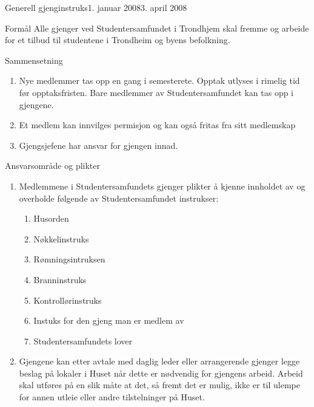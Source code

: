 

\begin{instruks}{Generell gjenginstruks}{1. januar 2008}{3. april 2008}
    
    \begin{instruksledd}{Formål}
        Alle gjenger ved Studentersamfundet i Trondhjem skal fremme og arbeide for et
        tilbud til studentene i Trondheim og byens befolkning.
    \end{instruksledd}


    \begin{instruksledd}{Sammensetning}
        \begin{enumerate}
            \item Nye medlemmer tas opp en gang i semesterete. Opptak utlyses i rimelig
                tid før opptaksfristen. Bare medlemmer av Studentersamfundet kan tas opp i
                gjengene.
            \item Et medlem kan innvilges permisjon og kan også fritas fra sitt medlemskap
            \item Gjengsjefene har ansvar for gjengen innad.
        \end{enumerate}

    \end{instruksledd}


    \begin{instruksledd}{Ansvarsområde og plikter}
        \begin{enumerate}
            \item Medlemmene i Studentersamfundets gjenger plikter å kjenne innholdet av
                og overholde følgende av Studentersamfundet instrukser:
                \begin{enumerate}
                    \item Husorden
                    \item Nøkkelinstruks
                    \item Rømningsintruksen
                    \item Branninstruks
                    \item Kontrollørinstruks
                    \item Instuks for den gjeng man er medlem av
                    \item Studentersamfundets lover
                \end{enumerate}
            \item Gjengene kan etter avtale med daglig leder eller arrangerende gjenger
                legge beslag på lokaler i Huset når dette er nødvendig for gjengens
                arbeid. Arbeid skal utføres på en slik måte at det, så fremt det er mulig,
                ikke er til ulempe for annen utleie eller andre tilstelninger på Huset.
        \end{enumerate}

    \end{instruksledd}


\end{instruks}



